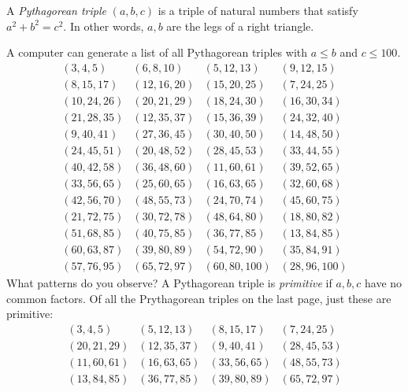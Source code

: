 \documentclass[12pt]{exam}
\begin{document}
\begin{questions}
  \question A \emph{Pythagorean triple} $(a,b,c)$ is a triple of natural numbers that satisfy $a^2+b^2=c^2$. In other words, $a,b$ are the legs of a right triangle.
  
  A computer can generate a list of all Pythagorean triples with $a\leq b$ and $c\leq100$.
  \begin{equation*}
    \begin{array}{llll}
      ( 3, 4, 5) & ( 6, 8,10) & ( 5,12, 13) & ( 9,12, 15) \\ 
      ( 8,15,17) & (12,16,20) & (15,20, 25) & ( 7,24, 25) \\ 
      (10,24,26) & (20,21,29) & (18,24, 30) & (16,30, 34) \\ 
      (21,28,35) & (12,35,37) & (15,36, 39) & (24,32, 40) \\ 
      ( 9,40,41) & (27,36,45) & (30,40, 50) & (14,48, 50) \\ 
      (24,45,51) & (20,48,52) & (28,45, 53) & (33,44, 55) \\ 
      (40,42,58) & (36,48,60) & (11,60, 61) & (39,52, 65) \\ 
      (33,56,65) & (25,60,65) & (16,63, 65) & (32,60, 68) \\ 
      (42,56,70) & (48,55,73) & (24,70, 74) & (45,60, 75) \\ 
      (21,72,75) & (30,72,78) & (48,64, 80) & (18,80, 82) \\ 
      (51,68,85) & (40,75,85) & (36,77, 85) & (13,84, 85) \\ 
      (60,63,87) & (39,80,89) & (54,72, 90) & (35,84, 91) \\ 
      (57,76,95) & (65,72,97) & (60,80,100) & (28,96,100)
    \end{array}
  \end{equation*}
  What patterns do you observe?
  \newpage
  \question A Pythagorean triple is \emph{primitive} if $a,b,c$ have no common factors. Of all the Prythagorean triples on the last page, just these are primitive:
  \begin{equation*}
    \begin{array}{llll}
      ( 3, 4, 5) & ( 5,12,13) & ( 8,15,17) & ( 7,24,25) \\
      (20,21,29) & (12,35,37) & ( 9,40,41) & (28,45,53) \\
      (11,60,61) & (16,63,65) & (33,56,65) & (48,55,73) \\
      (13,84,85) & (36,77,85) & (39,80,89) & (65,72,97) \\
    \end{array}
  \end{equation*}
  \begin{parts}

\end{parts}
\end{questions}
\end{document}
